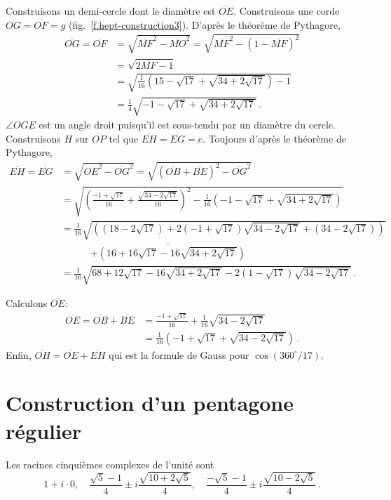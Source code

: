 Construisons un demi-cercle dont le diamètre est $\overline{OE}$. Construisons une corde $\overline{OG}=\overline{OF}=g$ (fig.~\ref{f.hept-construction3}). D'après le théorème de Pythagore,
\begin{align*}
\overline{OG}=\overline{OF}&=\sqrt{\overline{MF}^2-\overline{MO}^2}=\sqrt{\overline{MF}^2-(1-\overline{MF})^2}\\
&=\sqrt{2\overline{MF}-1}\\
&=\sqrt{\frac{1}{16}\left(15-\sqrt{17}+\sqrt{34+2\sqrt{17}}\right)-1}\\
&=\frac{1}{4}\sqrt{-1-\sqrt{17}+\sqrt{34+2\sqrt{17}}}\,.
\end{align*}
$\angle OGE$ est un angle droit puisqu'il est sous-tendu par un diamètre du cercle. Construisons $H$ sur $\overline{OP}$ tel que $\overline{EH}=\overline{EG}=e$. Toujours d'après le théorème de Pythagore,
\begin{align*}
\overline{EH}=\overline{EG}&=\sqrt{\overline{OE}^2-\overline{OG}^2}=\sqrt{(\overline{OB}+\overline{BE})^2-\overline{OG}^2}\\
&=\sqrt{\left(\frac{-1+\sqrt{17}}{16}+\frac{\sqrt{34-2\sqrt{17}}}{16}\right)^2-
\frac{1}{16}\left(-1-\sqrt{17}+\sqrt{34+2\sqrt{17}}\right)}
\\
&=\frac{1}{16}\sqrt{\left(
(18-2\sqrt{17})+ 2(-1+\sqrt{17})\sqrt{34-2\sqrt{17}}+
(34-2\sqrt{17})\right)}\\
&\quad\quad\quad\overline{
+\left(16+16\sqrt{17}-16\sqrt{34+2\sqrt{17}}\right)}\\
&=\frac{1}{16}\sqrt{
68+12\sqrt{17}-16\sqrt{34+2\sqrt{17}}-2(1-\sqrt{17})\sqrt{34-2\sqrt{17}}
}\,.
\end{align*}


Calculons $\overline{OE}$:
\begin{align*}
\overline{OE}=\overline{OB}+\overline{BE}&=\frac{-1+\sqrt{17}}{16}+\frac{1}{16}\sqrt{34-2\sqrt{17}}\\
&=\frac{1}{16}\left(-1+\sqrt{17}+\sqrt{34-2\sqrt{17}}\right)\,.
\end{align*}
Enfin, $\overline{OH}=\overline{OE}+\overline{EH}$ qui est la formule de Gauss pour $\cos (360^\circ/17)$.



\section{Construction d'un pentagone régulier}\label{s.hept-pentagon}


\begin{advanced}
Les racines cinquièmes complexes de l'unité sont 
\[
1+i\cdot 0,\quad\frac{\sqrt{5}-1}{4}\pm i \frac{\sqrt{10+2\sqrt{5}}}{4},\quad\frac{-\sqrt{5}-1}{4}\pm i \frac{\sqrt{10-2\sqrt{5}}}{4}\,.
\]
\vspace{-3ex}
\end{advanced}

